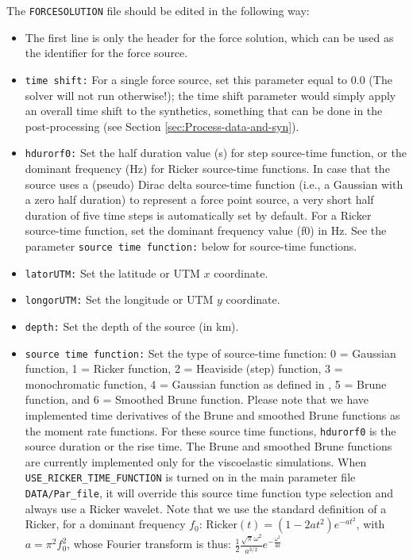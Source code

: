 \noindent The \texttt{FORCESOLUTION} file should be edited in the
following way:
\begin{itemize}
\item The first line is only the header for the force solution, which can
be used as the identifier for the force source.
\item \texttt{time shift:} For a single force source, set
this  parameter equal to $0.0$ (The solver will not run otherwise!); the time
shift parameter would simply apply an overall time shift to the synthetics,
something that can be done in the post-processing (see Section \ref{sec:Process-data-and-syn}).
\item \texttt{hdurorf0:} Set the half duration value (s) for step source-time
function, or the dominant frequency (Hz) for Ricker source-time functions.
In case that the source uses a (pseudo) Dirac delta source-time function (i.e., a Gaussian with a zero half duration) to represent
a force point source, a very short half duration of five time steps is automatically set by default.
For a Ricker source-time function, set the dominant frequency value (f0) in Hz.
See the parameter \texttt{source time function:} below for source-time functions.
\item \texttt{latorUTM:} Set the latitude or UTM $x$ coordinate.
\item \texttt{longorUTM:} Set the longitude or UTM $y$ coordinate.
\item \texttt{depth:} Set the depth of the source (in km).
\item \texttt{source time function:} Set the type of source-time function: 0 = Gaussian function, 1 = Ricker function, 2 = Heaviside (step) function, 3 = monochromatic function, 4 = Gaussian function as defined in \citet{Meschede2011}, 5 = Brune function, and 6 = Smoothed Brune function. Please note that we have implemented time derivatives of the Brune and smoothed Brune functions as the moment rate functions. For these source time functions, \texttt{hdurorf0} is the source duration or the rise time. The Brune and smoothed Brune functions are currently implemented only for the viscoelastic simulations.
When {\texttt{USE\_RICKER\_TIME\_FUNCTION}} is turned on in the main parameter file \texttt{DATA/Par\_file},
it will override this source time function type selection and always use a Ricker wavelet.
Note that we use the standard definition of a Ricker, for a dominant frequency $f_0$:
$\mathrm{Ricker}(t) = (1 - 2 a t^2) e^{-a t^2}$, with $a = \pi^2 f_0^2$,
whose Fourier transform is thus:
$\frac{1}{2} \frac{\sqrt{\pi}\omega^2}{a^{3/2}}e^{-\frac{\omega^2}{4 a}}$

\end{itemize}
